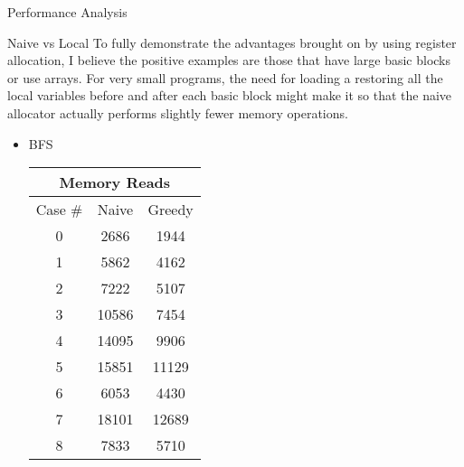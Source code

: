 \documentclass[letterpaper,12pt]{article}
\theoremstyle{definition}
\begin{document}
    \begin{section}{Performance Analysis}
        \begin{subsection}{Naive vs Local}
            To fully demonstrate the advantages brought on by using register allocation, I believe the positive examples are those that have large basic blocks or use arrays. For very small programs, the need for loading a restoring all the local variables before and after each basic block might make it so that the naive allocator actually performs slightly fewer memory operations.
            \begin{itemize}
                \item BFS
                    \begin{table}[H]
                        \begin{minipage}{.4\textwidth}
                            \centering
                            \begin{tabular}{|c|c|c|}
                                \hline
                                \multicolumn{3}{|c|}{Memory Reads}\\
                                \hline
                                Case \# & Naive & Greedy \\
                                \hline
                                0 & 2686 & 1944 \\
                                \hline
                                1 & 5862 & 4162 \\
                                \hline
                                2 & 7222 & 5107 \\
                                \hline
                                3 & 10586 & 7454 \\
                                \hline
                                4 & 14095 & 9906 \\
                                \hline
                                5 & 15851 & 11129 \\
                                \hline
                                6 & 6053 & 4430 \\
                                \hline
                                7 & 18101 & 12689 \\
                                \hline
                                8 & 7833 & 5710 \\
                                \hline

\end{tabular}
\end{minipage}
\end{table}
\end{itemize}
\end{subsection}
\end{section}
\end{document}
